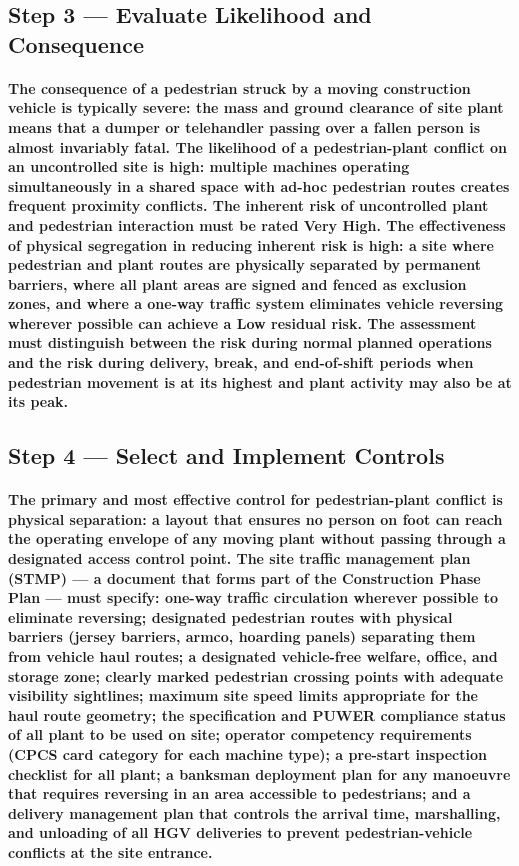 \subsection{Step 3 --- Evaluate Likelihood and Consequence}
\paragraph{The consequence of a pedestrian struck by a moving construction vehicle is typically severe: the mass and ground clearance of site plant means that a dumper or telehandler passing over a fallen person is almost invariably fatal. The likelihood of a pedestrian-plant conflict on an uncontrolled site is high: multiple machines operating simultaneously in a shared space with ad-hoc pedestrian routes creates frequent proximity conflicts. The inherent risk of uncontrolled plant and pedestrian interaction must be rated Very High. The effectiveness of physical segregation in reducing inherent risk is high: a site where pedestrian and plant routes are physically separated by permanent barriers, where all plant areas are signed and fenced as exclusion zones, and where a one-way traffic system eliminates vehicle reversing wherever possible can achieve a Low residual risk. The assessment must distinguish between the risk during normal planned operations and the risk during delivery, break, and end-of-shift periods when pedestrian movement is at its highest and plant activity may also be at its peak.}

\subsection{Step 4 --- Select and Implement Controls}
\paragraph{The primary and most effective control for pedestrian-plant conflict is physical separation: a layout that ensures no person on foot can reach the operating envelope of any moving plant without passing through a designated access control point. The site traffic management plan (STMP) --- a document that forms part of the Construction Phase Plan --- must specify: one-way traffic circulation wherever possible to eliminate reversing; designated pedestrian routes with physical barriers (jersey barriers, armco, hoarding panels) separating them from vehicle haul routes; a designated vehicle-free welfare, office, and storage zone; clearly marked pedestrian crossing points with adequate visibility sightlines; maximum site speed limits appropriate for the haul route geometry; the specification and PUWER compliance status of all plant to be used on site; operator competency requirements (CPCS card category for each machine type); a pre-start inspection checklist for all plant; a banksman deployment plan for any manoeuvre that requires reversing in an area accessible to pedestrians; and a delivery management plan that controls the arrival time, marshalling, and unloading of all HGV deliveries to prevent pedestrian-vehicle conflicts at the site entrance.}

